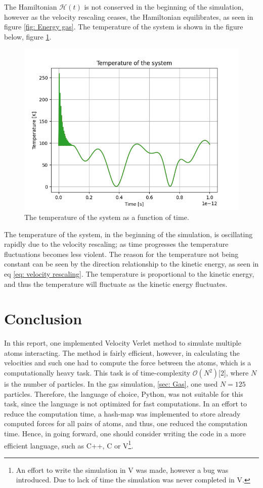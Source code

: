 \documentclass[a4paper]{article}
\newcommand{\newparagraph}{\vspace{.5cm}\noindent}
\begin{document}
\newparagraph
The Hamiltonian $\mathcal{H}(t)$ is not conserved in the beginning of the simulation, however as the velocity rescaling ceases, the Hamiltonian equilibrates, as seen in figure \ref{fig: Energy gas}.
The temperature of the system is shown in the figure below, figure \ref{fig: Temperature gas}.
\begin{figure}[H]
    \centering
    \includegraphics[scale = .5]{temperature.png}
    \caption{The temperature of the system as a function of time.}
    \label{fig: Temperature gas}
\end{figure}\noindent
The temperature of the system, in the beginning of the simulation, is oscillating rapidly due to the velocity rescaling; as time progresses the temperature fluctuations becomes less violent.
The reason for the temperature not being constant can be seen by the direction relationship to the kinetic energy, as seen in eq \eqref{eq: velocity rescaling}. The temperature is proportional to the kinetic energy, and thus the temperature will fluctuate as the kinetic energy fluctuates.
\section{Conclusion}
In this report, one implemented Velocity Verlet method to simulate multiple atoms interacting. The method is fairly efficient, however, in calculating the velocities and such one had to compute the force between the atoms, which is a computationally heavy task.
This task is of time-complexity $\mathcal{O}(N^2)$[2], where $N$ is the number of particles. In the gas simulation, \ref{sec: Gas}, one used $N = 125$ particles.
Therefore, the language of choice, Python, was not suitable for this task, since the language is not optimized for fast computations. In an effort to reduce the computation time, a hash-map was implemented to store already computed forces for all pairs of atoms, and thus, one reduced the computation time.
Hence, in going forward, one should consider writing the code in a more efficient language, such as C++, C or V\footnote{An effort to write the simulation in V was made, however a bug was introduced. Due to lack of time the simulation was never completed in V.}.
\end{document}
